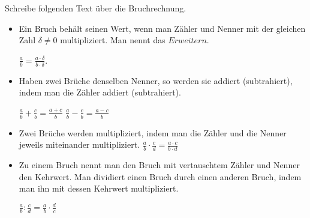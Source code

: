 \documentclass[12pt,a4paper]{article}
\begin{document}
    \setlength{\parindent}{0mm}
    \setcounter{tocdepth}{4}
    \pagestyle{empty}
    \large

    Schreibe folgenden Text über die Bruchrechnung.
    \begin{itemize}
        \item Ein Bruch behält seinen Wert, wenn man Zähler und Nenner mit der gleichen Zahl $\delta \neq 0$ multipliziert.
        Man nennt das $Erweitern$.
        \par $\frac{a}{b} = \frac{a \cdot \delta}{b \cdot \delta}$.

        \item Haben zwei Brüche denselben Nenner, so werden sie addiert (subtrahiert), indem man die Zähler addiert (subtrahiert).
        \par $\frac{a}{b} + \frac{c}{b} = \frac{a + c}{b}$ \hspace{1cm} $\frac{a}{b} - \frac{c}{b} = \frac{a - c}{b}$

        \item Zwei Brüche werden multipliziert, indem man die Zähler und die Nenner jeweils miteinander multipliziert.
        \hspace{1cm} $\frac{a}{b} \cdot \frac{c}{d} = \frac{a \cdot c}{b \cdot d}$

        \item Zu einem Bruch nennt man den Bruch mit vertauschtem Zähler und Nenner den Kehrwert.
        Man dividiert einen Bruch durch einen anderen Bruch, indem man ihn mit dessen Kehrwert multipliziert.
        \par $\frac{a}{b} : \frac{c}{d} = \frac{a}{b} \cdot \frac{d}{c}$
    \end{itemize}
\end{document}
